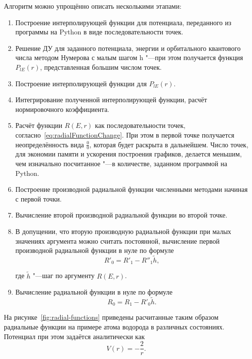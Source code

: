 Алгоритм можно упрощённо описать несколькими этапами:
\begin{enumerate}
    \item Построение интерполирующей функции для потенциала, переданного из программы на Python в виде
    последовательности точек.
    \item Решение ДУ для заданного потенциала, энергии и орбитального квантового числа методом Нумерова с малым шагом h
    "---при этом получается функция $P_{l E}(r)$, представленная большим числом точек.
    \item Построение интерполирующей функции для $P_{l E}(r)$.
    \item Интегрирование полученной интерполирующей функции, расчёт нормировочного коэффициента.
    \item Расчёт функции $R(E, r)$ как последовательности точек, согласно~\eqref{eq:radialFunctionChange}. При этом в
    первой точке получается неопределённость вида $\frac{0}{0}$, которая будет раскрыта в дальнейшем. Число точек,
    для экономии памяти и ускорения построения графиков, делается меньшим, чем изначально посчитанное "---в количестве,
    заданном программой на Python.
    \item Построение производной радиальной функции численными методами\cite{Fornberg1988GenerationOF} начиная с первой
    точки.
    \item Вычисление второй производной радиальной функции во второй точке.
    \item В допущении, что вторую производную радиальной функции при малых значениях аргумента можно считать постоянной,
    вычисление первой производной радиальной функции в нуле по формуле
    \begin{equation}
      R'_0 = R'_1 - R''_1 \tilde{h},
    \end{equation}

    где $\tilde{h}$ "---шаг по аргументу $R(E, r)$.

    \item Вычисление радиальной функции в нуле по формуле
    \begin{equation}
      R_0 = R_1 - R'_0 \tilde{h}.
    \end{equation}
\end{enumerate}

На рисунке~\ref{fig:radial-functions} приведены расчитанные таким образом радиальные функции на примере атома водорода
в различных состояниях. Потенциал при этом задаётся аналитически как
\begin{equation}
V(r) = -\frac{2}{r}.
\end{equation}

